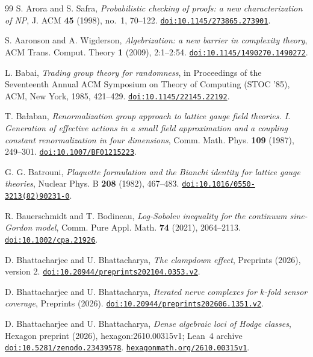 \begin{thebibliography}{99}
S. Arora and S. Safra,
\emph{Probabilistic checking of proofs: a new characterization of NP},
J. ACM \textbf{45} (1998), no.~1, 70--122.
\href{https://doi.org/10.1145/273865.273901}{\nolinkurl{doi:10.1145/273865.273901}}.

S. Aaronson and A. Wigderson,
\emph{Algebrization: a new barrier in complexity theory},
ACM Trans. Comput. Theory \textbf{1} (2009), 2:1--2:54.
\href{https://doi.org/10.1145/1490270.1490272}{\nolinkurl{doi:10.1145/1490270.1490272}}.

L. Babai,
\emph{Trading group theory for randomness},
in Proceedings of the Seventeenth Annual ACM Symposium on Theory of Computing (STOC '85), ACM, New York, 1985, 421--429.
\href{https://doi.org/10.1145/22145.22192}{\nolinkurl{doi:10.1145/22145.22192}}.

T. Ba{\l}aban,
\emph{Renormalization group approach to lattice gauge field theories. I. Generation of effective actions in a small field approximation and a coupling constant renormalization in four dimensions},
Comm. Math. Phys. \textbf{109} (1987), 249--301.
\href{https://doi.org/10.1007/BF01215223}{\nolinkurl{doi:10.1007/BF01215223}}.

G. G. Batrouni,
\emph{Plaquette formulation and the Bianchi identity for lattice gauge theories},
Nuclear Phys. B \textbf{208} (1982), 467--483.
\href{https://doi.org/10.1016/0550-3213(82)90231-0}{\nolinkurl{doi:10.1016/0550-3213(82)90231-0}}.

R. Bauerschmidt and T. Bodineau,
\emph{Log-Sobolev inequality for the continuum sine-Gordon model},
Comm. Pure Appl. Math. \textbf{74} (2021), 2064--2113.
\href{https://doi.org/10.1002/cpa.21926}{\nolinkurl{doi:10.1002/cpa.21926}}.

D. Bhattacharjee and U. Bhattacharya,
\emph{The clampdown effect},
Preprints (2026), version 2.
\href{https://doi.org/10.20944/preprints202104.0353.v2}{\nolinkurl{doi:10.20944/preprints202104.0353.v2}}.

D. Bhattacharjee and U. Bhattacharya,
\emph{Iterated nerve complexes for $k$-fold sensor coverage},
Preprints (2026).
\href{https://doi.org/10.20944/preprints202606.1351.v2}{\nolinkurl{doi:10.20944/preprints202606.1351.v2}}.

D. Bhattacharjee and U. Bhattacharya,
\emph{Dense algebraic loci of Hodge classes},
Hexagon preprint (2026), hexagon:2610.00315v1;
Lean~4 archive \href{https://doi.org/10.5281/zenodo.23439578}{\nolinkurl{doi:10.5281/zenodo.23439578}}.
\href{https://hexagonmath.org/2610.00315v1}{\nolinkurl{hexagonmath.org/2610.00315v1}}.


\end{thebibliography}
